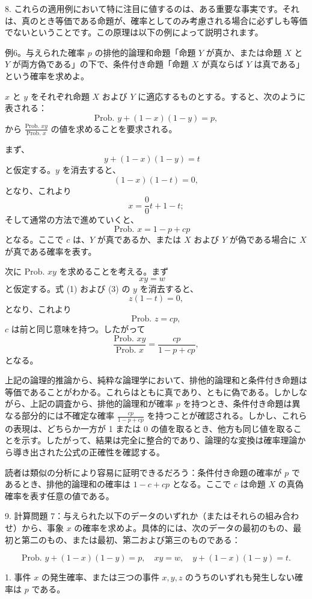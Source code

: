 \documentclass[a4paper,11pt,openany]{ltjsbook}
\begin{document}
8. これらの適用例において特に注目に値するのは、ある重要な事実です。それは、真のとき等価である命題が、確率としてのみ考慮される場合に必ずしも等価でないということです。この原理は以下の例によって説明されます。

例6。与えられた確率 \( p \) の排他的論理和命題「命題 \( Y \) が真か、または命題 \( X \) と \( Y \) が両方偽である」の下で、条件付き命題「命題 \( X \) が真ならば \( Y \) は真である」という確率を求めよ。

$x$ と $y$ をそれぞれ命題 $X$ および $Y$ に適応するものとする。すると、次のように表される：
\[
\text{Prob. } y + (1-x) (1-y) = p,
\]
から $\frac{\text{Prob. } xy}{\text{Prob. } x}$ の値を求めることを要求される。

まず、
\[
y + (1-x) (1-y) = t \quad \tag{1}
\]
と仮定する。$y$ を消去すると、
\[
(1-x) (1-t) = 0,
\]
となり、これより
\[
x = \frac{0}{0} t + 1 - t;
\]
そして通常の方法で進めていくと、
\[
\text{Prob. } x = 1-p + cp \quad \tag{2}
\]
となる。ここで $c$ は、$Y$ が真であるか、または $X$ および $Y$ が偽である場合に $X$ が真である確率を表す。

次に $\text{Prob. } xy$ を求めることを考える。まず
\[
xy = w \quad \tag{3}
\]
と仮定する。式 (1) および (3) の $y$ を消去すると、
\[
z (1-t) = 0,
\]
となり、これより
\[
\text{Prob. } z = cp,
\]
$c$ は前と同じ意味を持つ。したがって
\[
\frac{\text{Prob. } xy}{\text{Prob. } x} = \frac{cp}{1-p+cp},
\]
となる。

上記の論理的推論から、純粋な論理学において、排他的論理和と条件付き命題は等価であることがわかる。これらはともに真であり、ともに偽である。しかしながら、上記の調査から、排他的論理和が確率 $p$ を持つとき、条件付き命題は異なる部分的には不確定な確率 $\frac{cp}{1-p+cp}$ を持つことが確認される。しかし、これらの表現は、どちらか一方が 1 または 0 の値を取るとき、他方も同じ値を取ることを示す。したがって、結果は完全に整合的であり、論理的な変換は確率理論から導き出された公式の正確性を確認する。

読者は類似の分析により容易に証明できるだろう：条件付き命題の確率が $p$ であるとき、排他的論理和の確率は $1-c+cp$ となる。ここで $c$ は命題 $X$ の真偽確率を表す任意の値である。

9. 計算問題 7：与えられた以下のデータのいずれか（またはそれらの組み合わせ）から、事象 $x$ の確率を求めよ。具体的には、次のデータの最初のもの、最初と第二のもの、または最初、第二および第三のものである：

\[
\text{Prob. } y + (1-x) (1-y) = p, \quad
xy = w, \quad
y + (1-x) (1-y) = t.
\]

1. 事件 \(x\) の発生確率、または三つの事件 \(x, y, z\) のうちのいずれも発生しない確率は \(p\) である。
\end{document}
